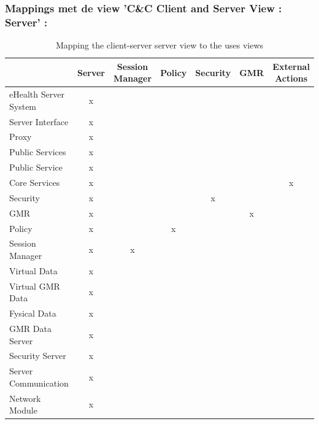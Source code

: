 \documentclass[a4paper,10pt]{article}
\begin{document}
\subsubsection{Mappings met de view 'C\&C Client and Server View : Server' :}
\begin{table}[h!]
\begin{center}
 \begin{tabular}{l|c|c|c|c|c|c|} 
 & Server & Session Manager & Policy & Security & GMR & External Actions\\ \hline
eHealth Server System & x & & & & &  \\ \hline
\hspace{6pt}Server Interface & x & & & & & \\ \hline
\hspace{12pt}Proxy & x & & & & & \\ \hline
\hspace{6pt}Public Services & x & & & & & \\ \hline
\hspace{12pt}Public Service & x & & & & & \\ \hline
\hspace{6pt}Core Services & x & & & & & x \\ \hline
\hspace{12pt}Security & x & & & x & & \\ \hline
\hspace{12pt}GMR & x & & & & x & \\ \hline
\hspace{12pt}Policy & x & & x & & & \\ \hline
\hspace{12pt}Session Manager & x & x & & & & \\ \hline
\hspace{6pt}Virtual Data & x & & & & & \\ \hline
\hspace{12pt}Virtual GMR Data & x  & & & & & \\ \hline
\hspace{6pt}Fysical Data & x & & & & & \\ \hline
\hspace{12pt}GMR Data Server & x & & & & & \\ \hline
\hspace{12pt}Security Server & x & & & & & \\ \hline
\hspace{6pt}Server Communication & x & & & & & \\ \hline
\hspace{12pt}Network Module & x & & & & & \\ \hline
\end{tabular}
\caption{Mapping the client-server server view to the uses views}
\end{center}
\end{table}
\end{document}
